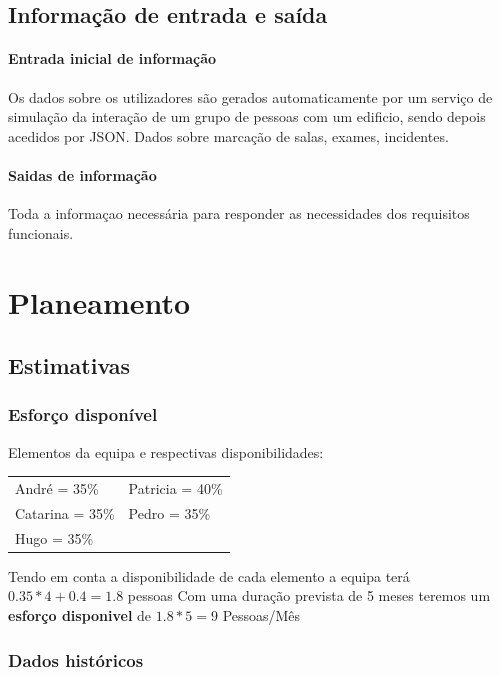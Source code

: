 \documentclass[a4paper]{report}
\begin{document}
\section{Informação de entrada e saída}
\subsubsection*{Entrada inicial de informação}
    Os dados sobre os utilizadores são gerados automaticamente por um serviço de simulação da interação de um grupo de pessoas com um edificio, sendo depois acedidos por JSON.
    Dados sobre marcação de salas, exames, incidentes.
\subsubsection*{Saidas de informação}
    Toda a informaçao necessária para responder as necessidades dos requisitos funcionais.
\chapter{Planeamento}
\section{Estimativas}
\subsection{Esforço disponível}
Elementos da equipa e respectivas disponibilidades:\\

\begin{tabularx}{\textwidth}{XX}
	André = 35\%    & Patricia = 40\% \\
	Catarina = 35\% & Pedro = 35\%    \\
	Hugo = 35\%     &
\end{tabularx}
\linebreak\linebreak
Tendo em conta a disponibilidade de cada elemento a equipa terá $0.35*4 + 0.4 =1.8$ pessoas\linebreak
Com uma duração prevista de 5 meses teremos um \textbf{esforço disponivel} de $1.8*5=9$ Pessoas/Mês
\subsection{Dados históricos}
\end{document}

